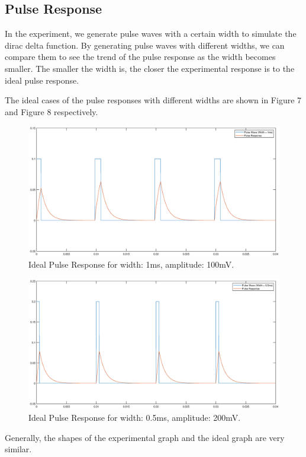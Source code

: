 \documentclass[a4paper]{article}
\begin{document}
\subsection{Pulse Response}
In the experiment, we generate pulse waves with a certain width to simulate the dirac delta function. By generating pulse waves with different widths, we can compare them to see the trend of the pulse response as the width becomes smaller. The smaller the width is, the closer the experimental response is to the ideal pulse response.

The ideal cases of the pulse responses with different widths are shown in Figure 7 and Figure 8 respectively.
\begin{figure}[H]
	\centering
	\includegraphics[width=0.8\linewidth]{9.eps}
	\caption{Ideal Pulse Response for width: 1ms, amplitude: 100mV.}
\end{figure}
\begin{figure}[H]
	\centering
	\includegraphics[width=0.8\linewidth]{10.eps}
	\caption{Ideal Pulse Response for width: 0.5ms, amplitude: 200mV.}
\end{figure}
Generally, the shapes of the experimental graph and the ideal graph are very similar.
\end{document}
